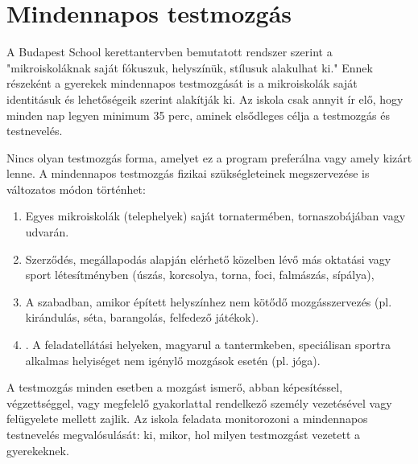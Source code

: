 \section{Mindennapos testmozgás}
\label{sec:mindennapos-testmozgas}

A Budapest School kerettantervben bemutatott rendszer szerint a "mikroiskoláknak saját fókuszuk, helyszínük, stílusuk alakulhat ki." Ennek részeként a gyerekek mindennapos testmozgását is a mikroiskolák saját identitásuk és lehetőségeik szerint alakítják ki. Az iskola csak annyit ír elő, hogy minden nap legyen minimum 35 perc, aminek elsődleges célja a testmozgás és testnevelés.

Nincs olyan testmozgás forma, amelyet ez a program preferálna vagy amely kizárt lenne. A mindennapos testmozgás fizikai szükségleteinek megszervezése is változatos módon történhet:
\begin{enumerate}
    \item Egyes mikroiskolák (telephelyek) saját tornatermében, tornaszobájában vagy udvarán.
    \item Szerződés, megállapodás alapján elérhető közelben lévő más oktatási vagy sport létesítményben (úszás, korcsolya, torna, foci, falmászás, sípálya),
    \item A szabadban, amikor épített helyszínhez nem kötődő mozgásszervezés (pl. kirándulás, séta, barangolás, felfedező játékok).
    \item. A feladatellátási helyeken, magyarul a tantermkeben, speciálisan sportra alkalmas helyiséget nem igénylő mozgások esetén (pl. jóga).
\end{enumerate}

A testmozgás minden esetben a mozgást ismerő, abban képesítéssel, végzettséggel, vagy megfelelő gyakorlattal rendelkező személy vezetésével vagy felügyelete mellett zajlik. Az iskola feladata monitorozoni a mindennapos testnevelés megvalósulását: ki, mikor, hol milyen testmozgást vezetett a gyerekeknek.
